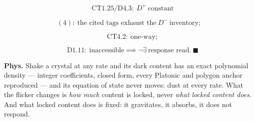 \begin{theorem}[{\texorpdfstring{CT4.5a — The flicker-dust ensemble: exact density polynomial and rate-invariant $w=0$}{CT4.5a - The flicker-dust ensemble: exact density polynomial and rate-invariant}}]
\[
\quad \mathrm{CT1.25}/\mathrm{D4.3}:\ D^+\ \text{constant}
\]

\[
(4):\ \text{the cited tags exhaust the}\ D^-\ \text{inventory};
\]

\[
\quad \mathrm{CT4.2}:\ \text{one-way};
\]

\[
\quad \mathrm{D1.11}:\ \text{inaccessible}\implies\neg\exists\ \text{response read}.\ \blacksquare
\]

\textbf{Phys.} Shake a crystal at any rate and its dark content has an exact polynomial density — integer coefficients, closed form, every Platonic and polygon anchor reproduced — and its equation of state never moves: dust at every rate. What the flicker changes is \textit{how much} content is locked, never \textit{what locked content does}. And what locked content does is fixed: it gravitates, it absorbs, it does not respond.

\end{theorem}

